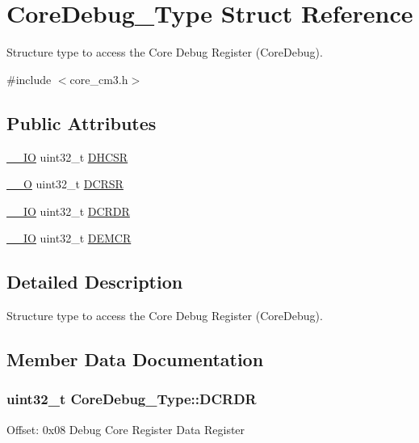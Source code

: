 \hypertarget{struct_core_debug___type}{\section{Core\-Debug\-\_\-\-Type Struct Reference}
\label{struct_core_debug___type}
}


Structure type to access the Core Debug Register (Core\-Debug).  




{\ttfamily \#include $<$core\-\_\-cm3.\-h$>$}

\subsection*{Public Attributes}
\begin{DoxyCompactItemize}
\item 
\hyperlink{group___c_m_s_i_s__core__definitions_gaec43007d9998a0a0e01faede4133d6be}{\-\_\-\-\_\-\-I\-O} uint32\-\_\-t \hyperlink{struct_core_debug___type_a25c14c022c73a725a1736e903431095d}{D\-H\-C\-S\-R}
\item 
\hyperlink{group___c_m_s_i_s__core__definitions_ga7e25d9380f9ef903923964322e71f2f6}{\-\_\-\-\_\-\-O} uint32\-\_\-t \hyperlink{struct_core_debug___type_afefa84bce7497652353a1b76d405d983}{D\-C\-R\-S\-R}
\item 
\hyperlink{group___c_m_s_i_s__core__definitions_gaec43007d9998a0a0e01faede4133d6be}{\-\_\-\-\_\-\-I\-O} uint32\-\_\-t \hyperlink{struct_core_debug___type_ab8f4bb076402b61f7be6308075a789c9}{D\-C\-R\-D\-R}
\item 
\hyperlink{group___c_m_s_i_s__core__definitions_gaec43007d9998a0a0e01faede4133d6be}{\-\_\-\-\_\-\-I\-O} uint32\-\_\-t \hyperlink{struct_core_debug___type_a5cdd51dbe3ebb7041880714430edd52d}{D\-E\-M\-C\-R}
\end{DoxyCompactItemize}


\subsection{Detailed Description}
Structure type to access the Core Debug Register (Core\-Debug). 

\subsection{Member Data Documentation}
\hypertarget{struct_core_debug___type_ab8f4bb076402b61f7be6308075a789c9}{
\subsubsection[{D\-C\-R\-D\-R}]{ uint32\-\_\-t Core\-Debug\-\_\-\-Type\-::\-D\-C\-R\-D\-R}}\label{struct_core_debug___type_ab8f4bb076402b61f7be6308075a789c9}
Offset\-: 0x08 Debug Core Register Data Register

